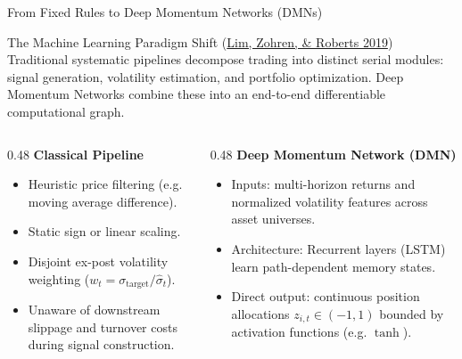 \documentclass[10pt]{beamer}
\begin{document}
\begin{frame}{From Fixed Rules to Deep Momentum Networks (DMNs)}
  \begin{block}{The Machine Learning Paradigm Shift (\href{https://arxiv.org/abs/1904.04912}{Lim, Zohren, \& Roberts 2019})}
    Traditional systematic pipelines decompose trading into distinct serial modules: signal generation, volatility estimation, and portfolio optimization. Deep Momentum Networks combine these into an end-to-end differentiable computational graph.
  \end{block}
  \vspace{0.1cm}
  \begin{columns}[t]
    \begin{column}{0.48\textwidth}
      \textbf{\scriptsize Classical Pipeline}
      \begin{itemize}\scriptsize
        \item Heuristic price filtering (e.g. moving average difference).
        \item Static sign or linear scaling.
        \item Disjoint ex-post volatility weighting ($w_t = \sigma_{\text{target}} / \hat{\sigma}_t$).
        \item Unaware of downstream slippage and turnover costs during signal construction.
      \end{itemize}
    \end{column}
    \begin{column}{0.48\textwidth}
      \textbf{\scriptsize Deep Momentum Network (DMN)}
      \begin{itemize}\scriptsize
        \item Inputs: multi-horizon returns and normalized volatility features across asset universes.
        \item Architecture: Recurrent layers (LSTM) learn path-dependent memory states.
        \item Direct output: continuous position allocations $z_{i,t} \in (-1, 1)$ bounded by activation functions (e.g. $\tanh$).
      \end{itemize}
    \end{column}
  \end{columns}
\end{frame}
\end{document}

